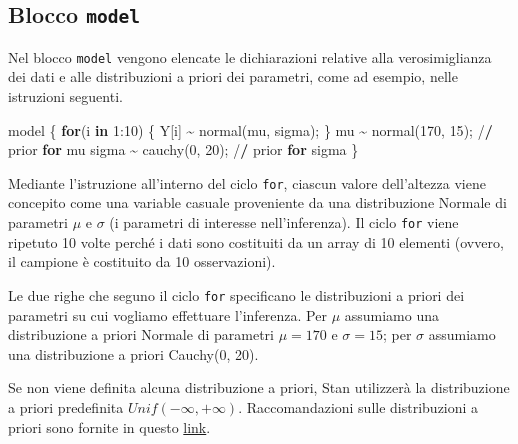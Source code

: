 \documentclass[
  10pt,
  italian,
  a4paper,
  extrafontsizes,onecolumn,openright
  ]{memoir}
\newenvironment{Shaded}{\begin{snugshade}}{\end{snugshade}}
\newcommand{\ControlFlowTok}[1]{\textcolor[rgb]{0.13,0.29,0.53}{\textbf{#1}}}
\newcommand{\DecValTok}[1]{\textcolor[rgb]{0.00,0.00,0.81}{#1}}
\newcommand{\ErrorTok}[1]{\textcolor[rgb]{0.64,0.00,0.00}{\textbf{#1}}}
\newcommand{\FunctionTok}[1]{\textcolor[rgb]{0.00,0.00,0.00}{#1}}
\newcommand{\NormalTok}[1]{#1}
\newcommand{\SpecialCharTok}[1]{\textcolor[rgb]{0.00,0.00,0.00}{#1}}
\begin{document}
\hypertarget{blocco-model}{%
\subsection{\texorpdfstring{Blocco \texttt{model}}{Blocco model}}\label{blocco-model}}

Nel blocco \texttt{model} vengono elencate le dichiarazioni relative alla verosimiglianza dei dati e alle distribuzioni a priori dei parametri, come ad esempio, nelle istruzioni seguenti.

\begin{Shaded}
\begin{Highlighting}[]
\NormalTok{model \{}
  \ControlFlowTok{for}\NormalTok{(i }\ControlFlowTok{in} \DecValTok{1}\SpecialCharTok{:}\DecValTok{10}\NormalTok{) \{}
\NormalTok{    Y[i] }\SpecialCharTok{\textasciitilde{}} \FunctionTok{normal}\NormalTok{(mu, sigma);}
\NormalTok{  \}}
\NormalTok{  mu }\SpecialCharTok{\textasciitilde{}} \FunctionTok{normal}\NormalTok{(}\DecValTok{170}\NormalTok{, }\DecValTok{15}\NormalTok{); }\SpecialCharTok{/}\ErrorTok{/}\NormalTok{ prior }\ControlFlowTok{for}\NormalTok{ mu}
\NormalTok{  sigma }\SpecialCharTok{\textasciitilde{}} \FunctionTok{cauchy}\NormalTok{(}\DecValTok{0}\NormalTok{, }\DecValTok{20}\NormalTok{); }\SpecialCharTok{/}\ErrorTok{/}\NormalTok{ prior }\ControlFlowTok{for}\NormalTok{ sigma}
\NormalTok{\}}
\end{Highlighting}
\end{Shaded}

\noindent
Mediante l'istruzione all'interno del ciclo \texttt{for}, ciascun valore dell'altezza viene concepito come una variable casuale proveniente da una distribuzione Normale di parametri \(\mu\) e \(\sigma\) (i parametri di interesse nell'inferenza). Il ciclo \texttt{for} viene ripetuto 10 volte perché i dati sono costituiti da un array di 10 elementi (ovvero, il campione è costituito da 10 osservazioni).

Le due righe che seguno il ciclo \texttt{for} specificano le distribuzioni a priori dei parametri su cui vogliamo effettuare l'inferenza. Per \(\mu\) assumiamo una distribuzione a priori Normale di parametri \(\mu = 170\) e \(\sigma = 15\); per \(\sigma\) assumiamo una distribuzione a priori Cauchy(0, 20).

Se non viene definita alcuna distribuzione a priori, Stan utilizzerà la distribuzione a priori predefinita \(Unif(-\infty, +\infty)\). Raccomandazioni sulle distribuzioni a priori sono fornite in questo \href{https://github.com/stan-dev/stan/wiki/Prior-Choice-Recommendations}{link}.
\end{document}
